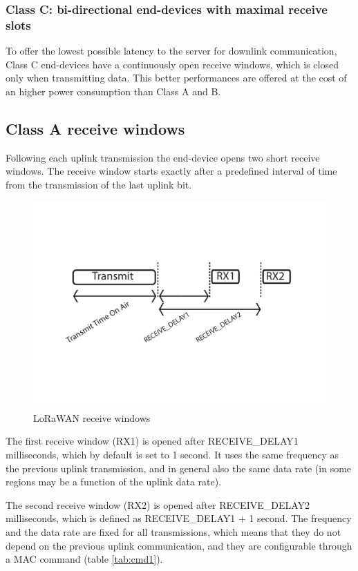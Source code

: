 \subsubsection{Class C: bi-directional end-devices with maximal receive slots}
To offer the lowest possible latency to the server for downlink communication, Class C end-devices have a continuously open receive windows, which is closed only when transmitting data. This better performances are offered at the cost of an higher power consumption than Class A and B.

\subsection{Class A receive windows}
Following each uplink transmission the end-device opens two short receive windows. The receive window starts exactly after a predefined interval of time from the transmission of the last uplink bit. \cite{lorawanspec}

\begin{figure}[h!]
\centering
\includegraphics[width=\textwidth]{img/recwin}
\caption{LoRaWAN receive windows}
\end{figure}


The first receive window (RX1) is opened after RECEIVE\_DELAY1 milliseconds, which by default is set to 1 second. It uses the same frequency as the previous uplink transmission, and in general also the same data rate (in some regions may be a function of the uplink data rate).

The second receive window (RX2) is opened after RECEIVE\_DELAY2 milliseconds, which is defined as RECEIVE\_DELAY1 + 1 second. The frequency and the data rate are fixed for all transmissions, which means that they do not depend on the previous uplink communication, and they are configurable through a MAC command (table \ref{tab:cmd1}).

